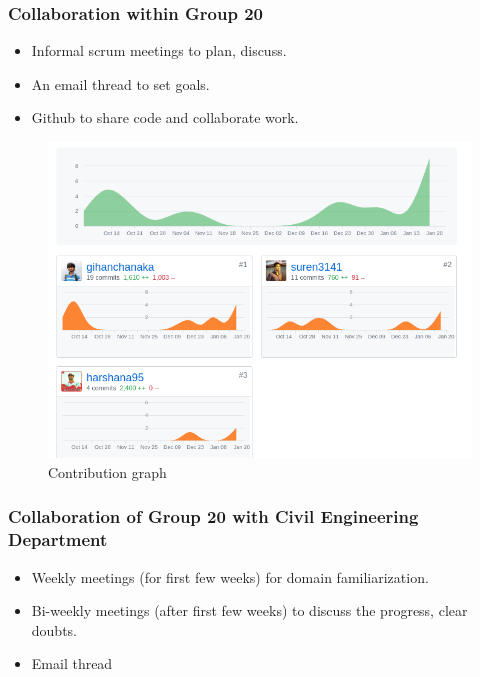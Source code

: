 \documentclass[12pt]{article}
\begin{document}
\subsubsection{Collaboration within Group 20}

\begin{itemize}
    \item Informal scrum meetings to plan, discuss.
    \item An email thread to set goals.
    \item Github to share code and collaborate work.
\end{itemize}
\begin{figure}[H]
    \centering
    \includegraphics[scale=0.5]{images/git-contrib.png}
    \caption{Contribution graph}
    \label{fig:my_label}
\end{figure}

\subsubsection{Collaboration of Group 20 with Civil Engineering Department}

\begin{itemize}
    \item Weekly meetings (for first few weeks) for domain familiarization.
    \item Bi-weekly meetings (after first few weeks) to discuss the progress, clear doubts.
    \item Email thread
\end{itemize}
\end{document}
